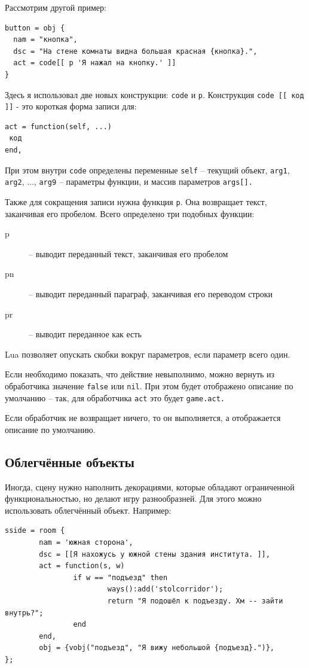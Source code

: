\documentclass[12pt]{article}
\begin{document}
Рассмотрим другой пример:

\begin{verbatim}
button = obj {
  nam = "кнопка",
  dsc = "На стене комнаты видна большая красная {кнопка}.",
  act = code[[ p 'Я нажал на кнопку.' ]]
}
\end{verbatim}

Здесь я использовал две новых конструкции: \verb/code/ и \verb/p/. Конструкция \verb/code [[ код ]]/ - это короткая форма записи для:

\begin{verbatim}
act = function(self, ...)
 код
end,
\end{verbatim}

При этом внутри \verb/code/ определены переменные \verb/self/ -- текущий объект, \verb/arg1/, \verb/arg2/, ..., \verb/arg9/ -- параметры функции, и массив параметров \verb/args[]./

Также для сокращения записи нужна функция \verb/p/. Она возвращает текст, заканчивая его пробелом. Всего определено три подобных функции:

\begin{description}
\item[p] -- выводит переданный текст, заканчивая его пробелом
\item[pn] -- выводит переданный параграф, заканчивая его переводом строки
\item[pr] -- выводит переданное как есть
\end{description}

Lua позволяет опускать скобки вокруг параметров, если параметр всего один.

Если необходимо показать, что действие невыполнимо, можно вернуть из обработчика значение \verb/false/ или \verb/nil/. При этом будет отображено описание по умолчанию -- так, для обработчика \verb/act/ это будет  \verb`game.act.`

Если обработчик не возвращает ничего, то он выполняется, а отображается описание по умолчанию.

\subsection{Облегчённые объекты}

Иногда, сцену нужно наполнить декорациями, которые обладают ограниченной функциональностью, но делают игру разнообразней. Для этого можно использовать облегчённый объект. Например:

\begin{verbatim}
sside = room {
        nam = 'южная сторона',
        dsc = [[Я нахожусь у южной стены здания института. ]],
        act = function(s, w)
                if w == "подъезд" then
                        ways():add('stolcorridor');
                        return "Я подошёл к подъезду. Хм -- зайти внутрь?";
                end
        end,
        obj = {vobj("подъезд", "Я вижу небольшой {подъезд}.")},
};
\end{verbatim}
\end{document}
